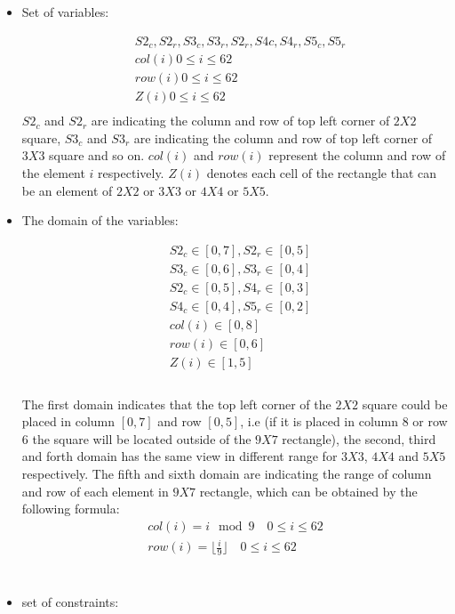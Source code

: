\documentclass[]{article}
\begin{document}
\begin{itemize}

\item{Set of variables:}

\begin{align*}
&S2_c, S2_r, S3_c, S3_r, S2_r, S4c, S4_r, S5_c, S5_r\\
&col(i) 0\leq i \leq 62\\ 
&row(i) 0\leq i \leq 62\\
&Z(i)   0\leq i \leq 62\\
\end{align*}
$S2_c$ and $S2_r$ are indicating the column and row of top left corner of $2X2$ square, $S3_c$ and $S3_r$ are indicating the column and row of top left corner of $3X3$ square and so on. 
$col(i)$ and $row(i)$ represent the column and row of the element $i$ respectively.
$Z(i)$ denotes each cell of the rectangle that can be an element of $2X2$ or $3X3$ or $4X4$ or $5X5$.
\item{The domain of the variables:}

\begin{align*}
&S2_c \in [0, 7], S2_r \in [0, 5]\\
&S3_c \in [0, 6], S3_r \in [0, 4]\\
&S2_c \in [0, 5], S4_r \in [0, 3]\\
&S4_c \in [0, 4], S5_r \in [0, 2]\\
&col(i) \in [0, 8]\\
&row(i) \in [0, 6]\\
&Z(i) \in [1,5]\\
\end{align*}
\\
The first domain indicates that the top left corner of the $2X2$ square could be placed in column $[0, 7]$ and row $[0, 5]$, i.e (if it is placed in column 8 or row 6 the square will be located outside of the $9X7$ rectangle), the second, third and forth domain has the same view in different range for $3X3$, $4X4$ and $5X5$ respectively.
The fifth and sixth domain are indicating the range of column and row of each element in $9X7$ rectangle, which can be obtained by the following formula: \\
\begin{align*}  
col(i) = i \mod 9 \quad 0 \leq i \leq 62\\
row(i) = \lfloor \frac{i}{9}\rfloor  \quad 0 \leq i \leq 62 \\
\end{align*}
\\
\item{set of constraints:}


\end{itemize}
\end{document}
